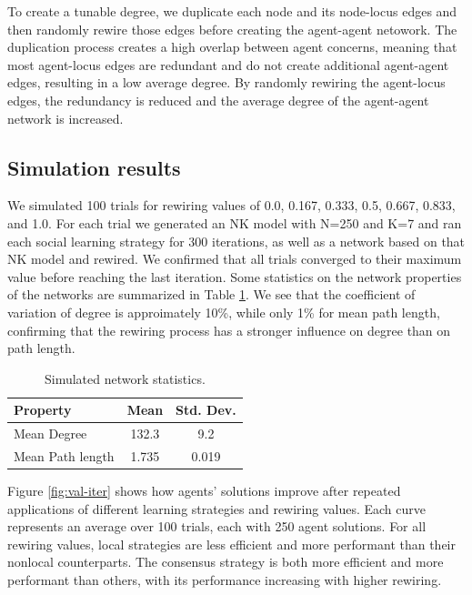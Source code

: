 \documentclass[10pt,twocolumn]{article}
\newcommand{\+}{\phantom{-}}
\begin{document}
To create a tunable degree, we duplicate each node and its node-locus edges and then
randomly rewire those edges before creating the agent-agent netowork.
The duplication process creates a high overlap between agent concerns,
meaning that most agent-locus edges are redundant and do not create additional agent-agent edges,
resulting in a low average degree.
By randomly rewiring the agent-locus edges, the redundancy is reduced and the average degree of
the agent-agent network is increased.

\subsection{Simulation results}

We simulated 100 trials for rewiring values of 0.0, 0.167, 0.333, 0.5, 0.667, 0.833, and 1.0.
For each trial we generated an NK model with N=250 and K=7 and ran each social learning strategy
for 300 iterations,
as well as a network based on that NK model and rewired.
We confirmed that all trials converged to their maximum value before reaching the last iteration.
Some statistics on the network properties of the networks are summarized in Table \ref{tab:stats}.
We see that the coefficient of variation of degree is approimately 10\%,
while only 1\% for mean path length, confirming that the rewiring process has a stronger influence
on degree than on path length.

\begin{table}
\small
\centering
\caption{
Simulated network statistics.
\label{tab:stats}
}
\bigskip
\begin{tabular}{lcc}
\hline
Property          & Mean  & Std. Dev. \\
\hline
Mean Degree       & 132.3 & 9.2 \\
Mean Path length  & 1.735 & 0.019 \\
\hline
\end{tabular}
\end{table}

Figure \ref{fig:val-iter} shows how agents' solutions improve after repeated applications of
different learning strategies and rewiring values.
Each curve represents an average over 100 trials, each with 250 agent solutions.
For all rewiring values, local strategies are less efficient and more performant than their
nonlocal counterparts.
The consensus strategy is both more efficient and more performant than others,
with its performance increasing with higher rewiring.
\end{document}
